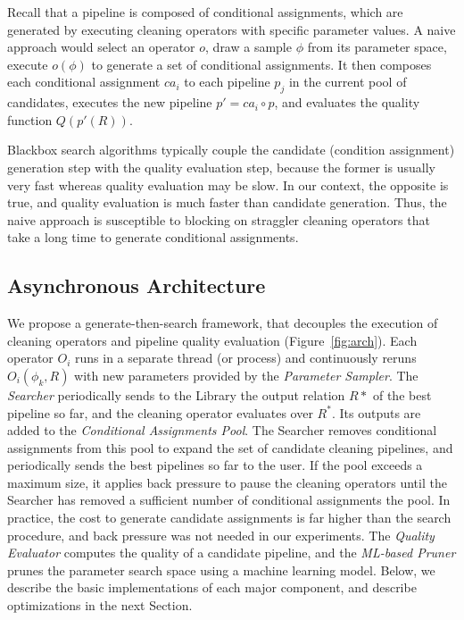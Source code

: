 Recall that a pipeline is composed of conditional assignments, which are generated by executing cleaning operators with specific parameter values.   A naive approach would select an operator $o$, draw a sample $\phi$ from its parameter space, execute $o(\phi)$ to generate a set of conditional assignments.      It then composes each conditional assignment $ca_i$ to each pipeline $p_j$ in the current pool of candidates, executes the new pipeline $p' = ca_i \circ p$, and evaluates the quality function $Q(p'(R))$.

Blackbox search algorithms typically couple the candidate (condition assignment) generation step with the quality evaluation step, because the former is usually very fast whereas quality evaluation may be slow.  In our context, the opposite is true, and quality evaluation is much faster than candidate generation.   Thus, the naive approach is susceptible to blocking on straggler cleaning operators that take a long time to generate conditional assignments. 

\subsection{Asynchronous Architecture}
We propose a generate-then-search framework, that decouples the execution of cleaning operators and pipeline quality evaluation (Figure~\ref{fig:arch}).  Each operator $O_i$ runs in a separate thread (or process) and continuously reruns $O_i(\phi_k, R)$ with new parameters provided by the {\it Parameter Sampler}.  The {\it Searcher} periodically sends to the Library the output relation $R*$ of the best pipeline so far, and the cleaning operator evaluates over $R^*$.  Its outputs are added to the {\it Conditional Assignments Pool}.  The Searcher removes conditional assignments from this pool to expand the set of candidate cleaning pipelines, and periodically sends the best pipelines so far to the user.   If the pool exceeds a maximum size, it applies back pressure to pause the cleaning operators until the Searcher has removed a sufficient number of conditional assignments the pool.  In practice, the cost to generate candidate assignments is far higher than the search procedure, and back pressure was not needed in our experiments.   The {\it Quality Evaluator} computes the quality of a candidate pipeline, and the {\it ML-based Pruner} prunes the parameter search space using a machine learning model.  Below, we describe the basic implementations of each major component, and describe optimizations in the next Section.


